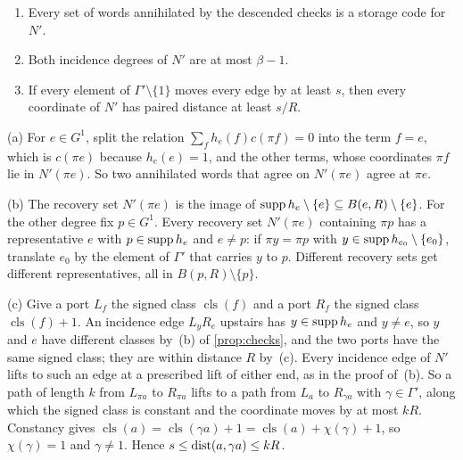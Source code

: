 \begin{proposition}[Descent]\label{prop:descent}
\begin{enumerate}[label=(\alph*)]
\item Every set of words annihilated by the descended checks is a storage code for~$N'$.
\item Both incidence degrees of $N'$ are at most $\beta-1$.
\item If every element of $\Gamma'\setminus\{1\}$ moves every edge by at least $s$, then every coordinate of $N'$ has
paired distance at least $s/R$.
\end{enumerate}
\end{proposition}
\begin{outline}
(a) For $e\in G^1$, split the relation $\sum_fh_e(f)c(\pi f)=0$ into the term $f=e$, which is $c(\pi e)$ because
$h_e(e)=1$, and the other terms, whose coordinates $\pi f$ lie in $N'(\pi e)$. So two annihilated words that agree on
$N'(\pi e)$ agree at $\pi e$.

(b) The recovery set $N'(\pi e)$ is the image of $\operatorname{supp} h_e\setminus\{e\}\subseteq B(e,R)\setminus\{e\}$. For the other
degree fix $p\in G^1$. Every recovery set $N'(\pi e)$ containing $\pi p$ has a representative $e$ with $p\in\operatorname{supp} h_e$
and $e\ne p$: if $\pi y=\pi p$ with $y\in\operatorname{supp} h_{e_0}\setminus\{e_0\}$, translate $e_0$ by the element of $\Gamma'$ that
carries $y$ to $p$. Different recovery sets get different representatives, all in $B(p,R)\setminus\{p\}$.

(c) Give a port $L_f$ the signed class $\operatorname{cls}(f)$ and a port $R_f$ the signed class
$\operatorname{cls}(f)+1$. An incidence edge $L_yR_e$ upstairs has $y\in\operatorname{supp} h_e$ and $y\ne e$, so $y$ and $e$ have
different classes by~(b) of \cref{prop:checks}, and the two ports have the same signed class; they are within distance
$R$ by~(c). Every incidence edge of $N'$ lifts to such an edge at a prescribed lift of either end, as in the proof of~(b).
So a path of length $k$ from $L_{\pi a}$ to $R_{\pi a}$ lifts to a path from $L_a$ to $R_{\gamma a}$ with
$\gamma\in\Gamma'$, along which the signed class is constant and the coordinate moves by at most $kR$. Constancy gives
$\operatorname{cls}(a)=\operatorname{cls}(\gamma a)+1=\operatorname{cls}(a)+\chi(\gamma)+1$, so $\chi(\gamma)=1$ and
$\gamma\ne1$. Hence $s\le\operatorname{dist}(a,\gamma a)\le kR$.
\end{outline}

